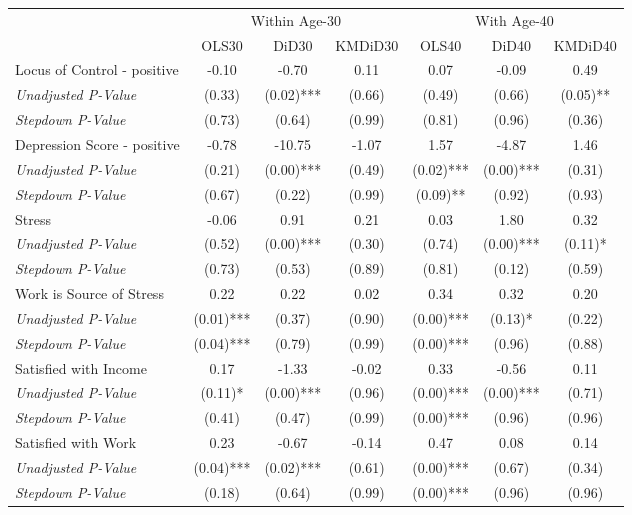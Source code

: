 \begin{tabular}{l c c c c c c}
\toprule
& \multicolumn{3}{c}{Within Age-30} & \multicolumn{3}{c}{With Age-40} \\\cmidrule(lr){2-4} \cmidrule(lr){5-7}
 & OLS30 & DiD30 & KMDiD30 & OLS40 & DiD40 & KMDiD40 \\
\midrule
Locus of Control - positive & -0.10 & -0.70 & 0.11 & 0.07 & -0.09 & 0.49 \\
\quad \textit{Unadjusted P-Value} & (0.33) & (0.02)*** & (0.66) & (0.49) & (0.66) & (0.05)** \\
\quad \textit{Stepdown P-Value} & (0.73) & (0.64) & (0.99) & (0.81) & (0.96) & (0.36) \\
Depression Score - positive & -0.78 & -10.75 & -1.07 & 1.57 & -4.87 & 1.46 \\
\quad \textit{Unadjusted P-Value} & (0.21) & (0.00)*** & (0.49) & (0.02)*** & (0.00)*** & (0.31) \\
\quad \textit{Stepdown P-Value} & (0.67) & (0.22) & (0.99) & (0.09)** & (0.92) & (0.93) \\
Stress & -0.06 & 0.91 & 0.21 & 0.03 & 1.80 & 0.32 \\
\quad \textit{Unadjusted P-Value} & (0.52) & (0.00)*** & (0.30) & (0.74) & (0.00)*** & (0.11)* \\
\quad \textit{Stepdown P-Value} & (0.73) & (0.53) & (0.89) & (0.81) & (0.12) & (0.59) \\
Work is Source of Stress & 0.22 & 0.22 & 0.02 & 0.34 & 0.32 & 0.20 \\
\quad \textit{Unadjusted P-Value} & (0.01)*** & (0.37) & (0.90) & (0.00)*** & (0.13)* & (0.22) \\
\quad \textit{Stepdown P-Value} & (0.04)*** & (0.79) & (0.99) & (0.00)*** & (0.96) & (0.88) \\
Satisfied with Income & 0.17 & -1.33 & -0.02 & 0.33 & -0.56 & 0.11 \\
\quad \textit{Unadjusted P-Value} & (0.11)* & (0.00)*** & (0.96) & (0.00)*** & (0.00)*** & (0.71) \\
\quad \textit{Stepdown P-Value} & (0.41) & (0.47) & (0.99) & (0.00)*** & (0.96) & (0.96) \\
Satisfied with Work & 0.23 & -0.67 & -0.14 & 0.47 & 0.08 & 0.14 \\
\quad \textit{Unadjusted P-Value} & (0.04)*** & (0.02)*** & (0.61) & (0.00)*** & (0.67) & (0.34) \\
\quad \textit{Stepdown P-Value} & (0.18) & (0.64) & (0.99) & (0.00)*** & (0.96) & (0.96) \\

\end{tabular}
